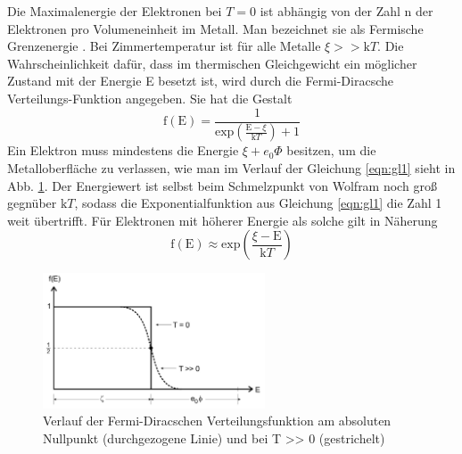 Die Maximalenergie der Elektronen bei $T = 0$ ist abhängig von der Zahl n der Elektronen pro Volumeneinheit im Metall.
Man bezeichnet sie als Fermische Grenzenergie \xi.
Bei Zimmertemperatur ist für alle Metalle $\xi >> \text{k}T$.
Die Wahrscheinlichkeit dafür, dass im thermischen Gleichgewicht ein möglicher Zustand mit der Energie E besetzt ist, wird durch die Fermi-Diracsche Verteilungs-Funktion angegeben.
Sie hat die Gestalt
\begin{equation}
    \text{f}(\text{E}) = \frac{1}{\text{exp}\left(\frac{\text{E} - \xi}{\text{k}T}\right) + 1}
    \label{eqn:gl1}
\end{equation}
Ein Elektron muss mindestens die Energie $\xi + e_0 \Phi$ besitzen, um die Metalloberfläche zu verlassen, wie man im Verlauf der Gleichung \ref{eqn:gl1} sieht in Abb. \ref{fig:abb2}.
Der Energiewert ist selbst beim Schmelzpunkt von Wolfram noch groß gegnüber $\text{k}T$, sodass die Exponentialfunktion aus Gleichung \ref{eqn:gl1} die Zahl 1 weit übertrifft.
Für Elektronen mit höherer Energie als solche gilt in Näherung
\begin{equation}
    \text{f}(\text{E}) \approx \text{exp}\left(\frac{\xi - \text{E}}{\text{k}T}\right)
    \label{eqn:gl2}
\end{equation}
\begin{figure}
    \centering
    \includegraphics[height=4.0cm]{data/abb2.jpg}
    \caption{Verlauf der Fermi-Diracschen Verteilungsfunktion am absoluten Nullpunkt (durchgezogene Linie) und bei T >> 0 (gestrichelt) \cite{V504}}
    \label{fig:abb2}
\end{figure} \\
\noindent

